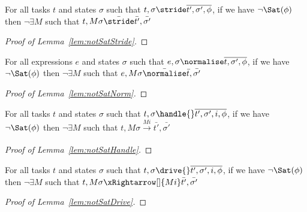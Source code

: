 \begin{lemma}
  \label{lem:notSatStride}
  For all tasks $t$ and states $\sigma$ such that $t,\sigma\stride\overline{t',\sigma',\phi}$, if we have $\neg\Sat(\phi)$ then $\neg\exists M$ such that $t,M\sigma\bar{\stride}\bar{t'},\bar{\sigma'}$

\end{lemma}



\begin{proof}[Proof of Lemma~\ref{lem:notSatStride}]

\end{proof}

\begin{lemma}
  \label{lem:notSatNorm}
  For all expressions $e$ and states $\sigma$ such that $e,\sigma\normalise\overline{t,\sigma',\phi}$, if we have $\neg\Sat(\phi)$ then $\neg\exists M$ such that $e,M\sigma\bar{\normalise}\bar{t},\bar{\sigma'}$

\end{lemma}



\begin{proof}[Proof of Lemma~\ref{lem:notSatNorm}]

\end{proof}

\begin{lemma}
  \label{lem:notSatHandle}
  For all tasks $t$ and states $\sigma$ such that $t,\sigma\handle{}\overline{t',\sigma',i,\phi}$, if we have $\neg\Sat(\phi)$ then $\neg\exists M$ such that $t,M\sigma\xrightarrow[]{Mi}\bar{t'},\bar{\sigma'}$

\end{lemma}



\begin{proof}[Proof of Lemma~\ref{lem:notSatHandle}]

\end{proof}

\begin{lemma}
  \label{lem:notSatDrive}
  For all tasks $t$ and states $\sigma$ such that $t,\sigma\drive{}\overline{t',\sigma',i,\phi}$, if we have $\neg\Sat(\phi)$ then $\neg\exists M$ such that $t,M\sigma\xRightarrow[]{Mi}\bar{t'},\bar{\sigma'}$

\end{lemma}

\begin{proof}[Proof of Lemma~\ref{lem:notSatDrive}]

\end{proof}
